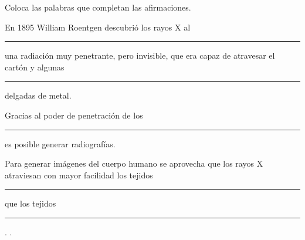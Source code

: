 Coloca las palabras que completan las afirmaciones.
\begin{center}
     \quad  {} \quad {} \quad {} \quad
     \quad {} \quad {} \quad
     \quad
\end{center}
\begin{parts}
    En 1895 William Roentgen descubrió los rayos X al \rule{2cm}{0.2mm}
    una radiación muy penetrante, pero invisible, que era capaz de atravesar el cartón y algunas \rule{2cm}{0.2mm}
    delgadas de metal.

    Gracias al poder de penetración de los \rule{2cm}{0.2mm}
    es posible generar radiografías.

    Para generar imágenes del cuerpo humano se aprovecha que los rayos X atraviesan con mayor facilidad los tejidos
    \rule{2cm}{0.2mm} que los tejidos \rule{2cm}{0.2mm}.
    .
\end{parts}
